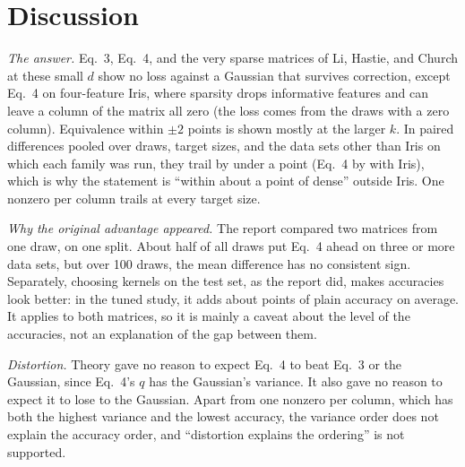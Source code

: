 \section{Discussion}

\emph{The answer.} Eq.~3, Eq.~4, and the very sparse matrices of Li, Hastie, and Church at these small $d$ show no loss against a Gaussian that survives correction, except Eq.~4 on four-feature Iris, where sparsity drops informative features and can leave a column of the matrix all zero (the loss comes from the draws with a zero column). Equivalence within $\pm 2$ points is shown mostly at the larger $k$. In paired differences pooled over draws, target sizes, and the data sets other than Iris on which each family was run, they trail by under a point (Eq.~4 by  with Iris), which is why the statement is ``within about a point of dense'' outside Iris. One nonzero per column trails at every target size.

\emph{Why the original advantage appeared.} The report compared two matrices from one draw, on one split. About half of all draws put Eq.~4 ahead on three or more data sets, but over 100 draws, the mean difference has no consistent sign. Separately, choosing kernels on the test set, as the report did, makes accuracies look better: in the tuned study, it adds about  points of plain accuracy on average. It applies to both matrices, so it is mainly a caveat about the level of the accuracies, not an explanation of the gap between them.

\emph{Distortion.} Theory gave no reason to expect Eq.~4 to beat Eq.~3 or the Gaussian, since Eq.~4's $q$ has the Gaussian's variance. It also gave no reason to expect it to lose to the Gaussian. Apart from one nonzero per column, which has both the highest variance and the lowest accuracy, the variance order does not explain the accuracy order, and ``distortion explains the ordering'' is not supported.
